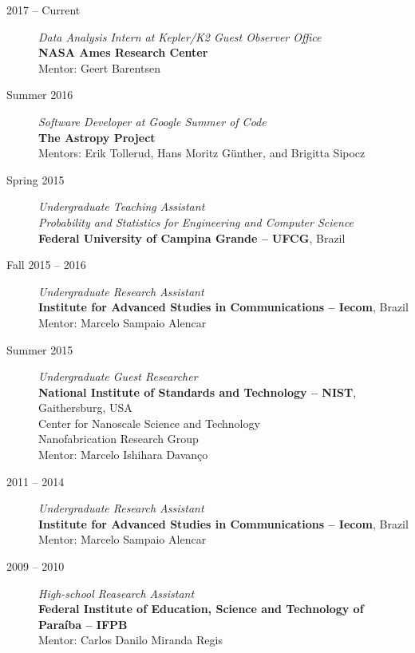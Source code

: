 \documentclass[10pt]{article}
\begin{document}
\begin{titlepage}
\begin{description}
\item[2017 -- Current] \emph{Data Analysis Intern at Kepler/K2 Guest Observer Office}
\\\textbf{NASA Ames Research Center}
\\Mentor: Geert Barentsen
\item[Summer 2016] \emph{Software Developer at Google Summer of Code}
\\\textbf{The Astropy Project}
\\Mentors: Erik Tollerud, Hans Moritz G\"unther, and Brigitta Sipocz
\item[Spring 2015] \emph{Undergraduate Teaching Assistant}
\\\emph{Probability and Statistics for Engineering and Computer Science}
\\\textbf{Federal University of Campina Grande -- UFCG}, Brazil
\item[Fall 2015 -- 2016] \emph{Undergraduate Research Assistant}
\\\textbf{Institute for Advanced Studies in Communications -- Iecom}, Brazil
\\Mentor: Marcelo Sampaio Alencar
\item[Summer 2015] \emph{Undergraduate Guest Researcher}
\\\textbf{National Institute of Standards and Technology -- NIST}, Gaithersburg, USA
\\Center for Nanoscale Science and Technology
\\Nanofabrication Research Group
\\Mentor: Marcelo Ishihara Davan\c co
\item[2011 -- 2014] \emph{Undergraduate Research Assistant}
\\\textbf{Institute for Advanced Studies in Communications -- Iecom}, Brazil
\\Mentor: Marcelo Sampaio Alencar
\item[2009 -- 2010] \emph{High-school Reasearch Assistant}
\\\textbf{Federal Institute of Education, Science and Technology of Para\'iba -- IFPB}
\\Mentor: Carlos Danilo Miranda Regis
\end{description}


\end{titlepage}
\end{document}

